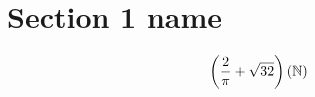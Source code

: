 \documentclass{article}
\begin{document}




\section*{Section 1 name}

\begin{align*}
	\left( \frac{2}{\pi} + \sqrt{32} \right)
	\left( \mathbb{N} \right) 
\end{align*}
\end{document}
